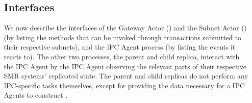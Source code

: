 
\subsection{Interfaces}

We now describe the interfaces of the Gateway Actor (\gw) and the Subnet Actor (\sa) \dapps (by listing the methods that can be invoked through transactions submitted to their respective subnets),
and the IPC Agent process (by listing the events it reacts to).
The other two processes, the parent and child replica, interact with the IPC Agent by the IPC Agent observing the relevant parts of their respective SMR systems' replicated state.
The parent and child replicas do not perform any IPC-specific tasks themselves, except for providing the data necessary for a IPC Agents to construct \pofsFull.

